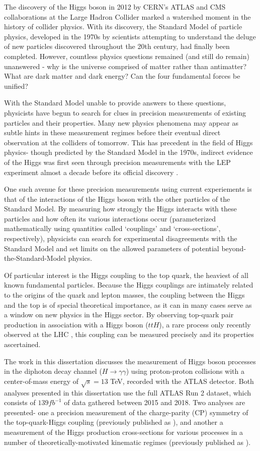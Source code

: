 The discovery of the Higgs boson in 2012 by CERN's ATLAS \cite{HiggsATLAS} and CMS \cite{HiggsCMS} collaborations at the Large Hadron Collider marked a watershed moment in the history of collider physics. With its discovery, the Standard Model of particle physics, developed in the 1970s by scientists attempting to understand the deluge of new particles discovered throughout the 20th century, had finally been completed. However, countless physics questions remained (and still do remain) unanswered - why is the universe comprised of matter rather than antimatter? What are dark matter and dark energy? Can the four fundamental forces be unified?

With the Standard Model unable to provide answers to these questions, physicists have begun to search for clues in precision measurements of existing particles and their properties. Many new physics phenomena may appear as subtle hints in these measurement regimes before their eventual direct observation at the colliders of tomorrow. This has precedent in the field of Higgs physics- though predicted by the Standard Model in the 1970s, indirect evidence of the Higgs was first seen through precision measurements with the LEP experiment almost a decade before its official discovery \cite{LEPExperiments}.

One such avenue for these precision measurements using current experiements is that of the interactions of the Higgs boson with the other particles of the Standard Model. By measuring how strongly the Higgs interacts with these particles and how often its various interactions occur (parameterized mathematically using quantities called `couplings' and `cross-sections', respectively), physicists can search for experimental disagreements with the Standard Model and set limits on the allowed parameters of potential beyond-the-Standard-Model physics.

Of particular interest is the Higgs coupling to the top quark, the heaviest of all known fundamental particles. Because the Higgs couplings are intimately related to the origins of the quark and lepton masses, the coupling between the Higgs and the top is of special theoretical importance, as it can in many cases serve as a window on new physics in the Higgs sector. By observing top-quark pair production in association with a Higgs boson ($ttH$), a rare process only recently observed at the LHC \cite{ttH}, this coupling can be measured precisely and its properties ascertained.

The work in this dissertation discusses the measurement of Higgs boson processes in the diphoton decay channel ($H \rightarrow \gamma \gamma$) using proton-proton collisions with a center-of-mass energy of $\sqrt{s} = 13$ TeV, recorded with the ATLAS detector.  Both analyses presented in this dissertation use the full ATLAS Run 2 dataset, which consists of $139 fb^{-1}$ of data gathered between 2015 and 2018. Two analyses are presented- one a precision measurement of the charge-parity (CP) symmetry of the top-quark-Higgs coupling (previously published as \cite{CPanalysis}), and another a measurement of the Higgs production cross-sections for various processes in a number of theoretically-motivated kinematic regimes (previously published as \cite{Couplingsanalysis}).
 
